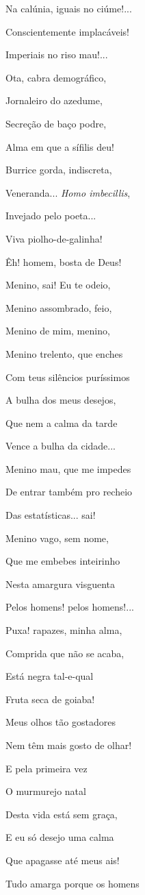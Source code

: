 Na calúnia, iguais no ciúme!...

Conscientemente implacáveis!

Imperiais no riso mau!...

Ota, cabra demográfico,

Jornaleiro do azedume,

Secreção de baço podre,

Alma em que a sífilis deu!

Burrice gorda, indiscreta,

Veneranda... \emph{Homo imbecillis},

Invejado pelo poeta...

Viva piolho-de-galinha!

Êh! homem, bosta de Deus!

Menino, sai! Eu te odeio,

Menino assombrado, feio,

Menino de mim, menino,

Menino trelento, que enches

Com teus silêncios puríssimos

A bulha dos meus desejos,

Que nem a calma da tarde

Vence a bulha da cidade...

Menino mau, que me impedes

De entrar também pro recheio

Das estatísticas... sai!

Menino vago, sem nome,

Que me embebes inteirinho

Nesta amargura visguenta

Pelos homens! pelos homens!...

Puxa! rapazes, minha alma,

Comprida que não se acaba,

Está negra tal-e-qual

Fruta seca de goiaba!

Meus olhos tão gostadores

Nem têm mais gosto de olhar!

E pela primeira vez

O murmurejo natal

Desta vida está sem graça,

E eu só desejo uma calma

Que apagasse até meus ais!

Tudo amarga porque os homens

